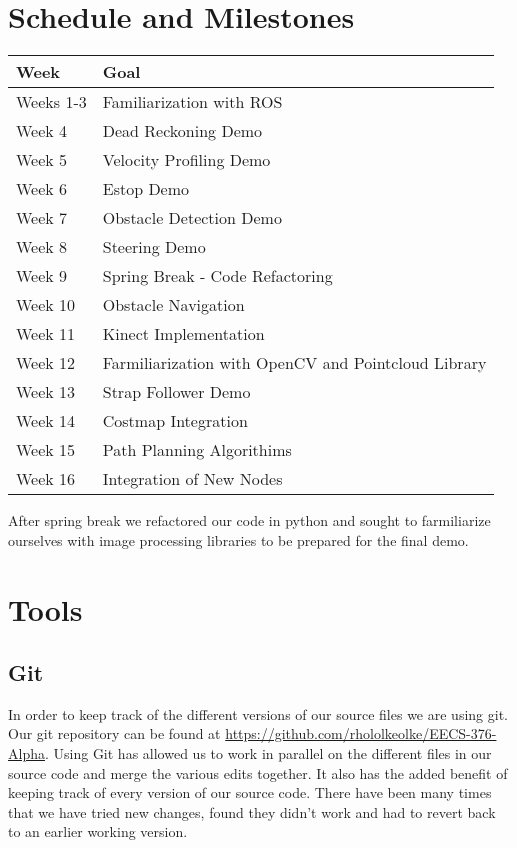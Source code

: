
\section{Schedule and Milestones}

\begin{longtable}{|l|l|}
  \hline {\bf Week} & {\bf Goal} \\ \hline
Weeks 1-3 & Familiarization with ROS \\ \hline
Week 4 & Dead Reckoning Demo \\ \hline
Week 5 & Velocity Profiling Demo \\ \hline
Week 6 & Estop Demo \\ \hline
Week 7 & Obstacle Detection Demo \\ \hline
Week 8 & Steering Demo \\ \hline
Week 9 & Spring Break - Code Refactoring \\ \hline
Week 10 & Obstacle Navigation \\ \hline
Week 11 & Kinect Implementation \\ \hline
Week 12 & Farmiliarization with OpenCV and Pointcloud Library \\ \hline
Week 13 & Strap Follower Demo \\ \hline
Week 14 & Costmap Integration \\ \hline
Week 15 & Path Planning Algorithims \\ \hline
Week 16 & Integration of New Nodes \\ \hline
\end{longtable}

After spring break we refactored our code in python and sought to farmiliarize ourselves with image processing libraries to be prepared for the final demo.

\section{Tools}

\subsection{Git}

In order to keep track of the different versions of our source files
we are using git.  Our git repository can be found at
\url{https://github.com/rhololkeolke/EECS-376-Alpha}.  Using Git has
allowed us to work in parallel on the different files in our source
code and merge the various edits together.  It also has the added
benefit of keeping track of every version of our source code. There
have been many times that we have tried new changes, found they didn't
work and had to revert back to an earlier working version.

